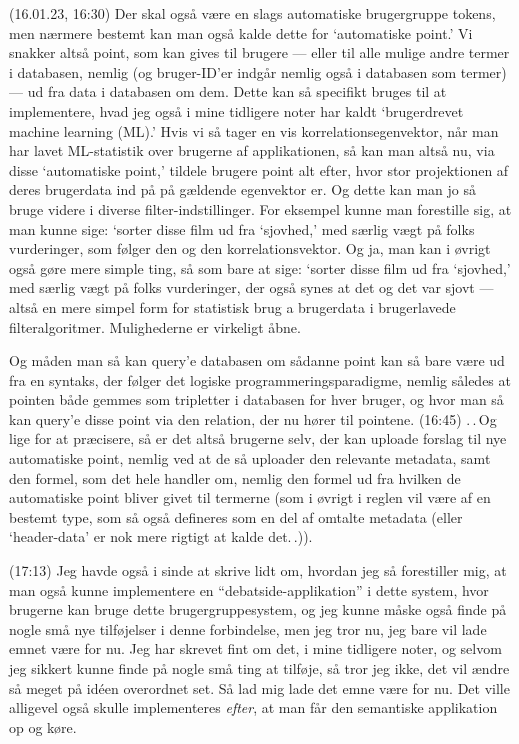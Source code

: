 \documentclass{report}
\begin{document}
(16.01.23, 16:30) Der skal også være en slags automatiske brugergruppe tokens, men nærmere bestemt kan man også kalde dette for `automatiske point.' Vi snakker altså point, som kan gives til brugere --- eller til alle mulige andre termer i databasen, nemlig (og bruger-ID'er indgår nemlig også i databasen som termer) --- ud fra data i databasen om dem. Dette kan så specifikt bruges til at implementere, hvad jeg også i mine tidligere noter har kaldt `brugerdrevet machine learning (ML).' Hvis vi så tager en vis korrelationsegenvektor, når man har lavet ML-statistik over brugerne af applikationen, så kan man altså nu, via disse `automatiske point,' tildele brugere point alt efter, hvor stor projektionen af deres brugerdata ind på på gældende egenvektor er. Og dette kan man jo så bruge videre i diverse filter-indstillinger. For eksempel kunne man forestille sig, at man kunne sige: `sorter disse film ud fra `sjovhed,' med særlig vægt på folks vurderinger, som følger den og den korrelationsvektor. Og ja, man kan i øvrigt også gøre mere simple ting, så som bare at sige: `sorter disse film ud fra `sjovhed,' med særlig vægt på folks vurderinger, der også synes at det og det var sjovt --- altså en mere simpel form for statistisk brug a brugerdata i brugerlavede filteralgoritmer. Mulighederne er virkeligt åbne.

Og måden man så kan query'e databasen om sådanne point kan så bare være ud fra en syntaks, der følger det logiske programmeringsparadigme, nemlig således at pointen både gemmes som tripletter i databasen for hver bruger, og hvor man så kan query'e disse point via den relation, der nu hører til pointene. (16:45) .\,.\,Og lige for at præcisere, så er det altså brugerne selv, der kan uploade forslag til nye automatiske point, nemlig ved at de så uploader den relevante metadata, samt den formel, som det hele handler om, nemlig den formel ud fra hvilken de automatiske point bliver givet til termerne (som i øvrigt i reglen vil være af en bestemt type, som så også defineres som en del af omtalte metadata (eller `header-data' er nok mere rigtigt at kalde det.\,.)). 

(17:13) Jeg havde også i sinde at skrive lidt om, hvordan jeg så forestiller mig, at man også kunne implementere en ``debatside-applikation'' i dette system, hvor brugerne kan bruge dette brugergruppesystem, og jeg kunne måske også finde på nogle små nye tilføjelser i denne forbindelse, men jeg tror nu, jeg bare vil lade emnet være for nu. Jeg har skrevet fint om det, i mine tidligere noter, og selvom jeg sikkert kunne finde på nogle små ting at tilføje, så tror jeg ikke, det vil ændre så meget på idéen overordnet set. Så lad mig lade det emne være for nu. Det ville alligevel også skulle implementeres \emph{efter}, at man får den semantiske applikation op og køre.
\end{document}

